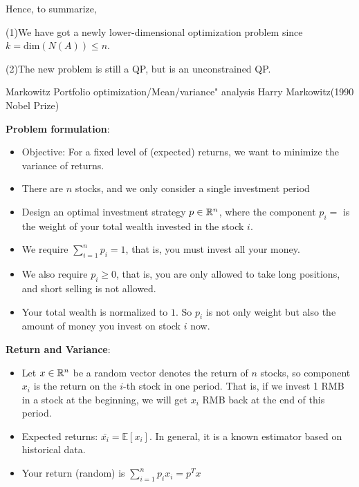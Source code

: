 Hence, to summarize,

(1)We have got a newly lower-dimensional optimization problem since $k =\text{dim}(N(A)) \leq n $.

(2)The new problem is still a QP, but is an unconstrained QP.



\begin{example}{Markowitz Portfolio optimization/Mean/variance" analysis}  Harry Markowitz(1990 Nobel Prize)
	
	
	\textbf{Problem formulation}: 
	\begin{itemize}
		\item Objective: For a fixed level of (expected) returns, we want to minimize the variance of returns.
		
		\item There are $n$ stocks, and we only consider a single investment period\\
		
		\item Design an optimal investment strategy $p\in \mathbb{R}^n$, where the component $p_i = $ is the weight of your total wealth invested in the stock $i$.
		
		\item We require $\sum^n_{i=1}p_i = 1$, that is, you must invest all your money.
		
		\item We also require $p_i \geq 0$, that is, you are only allowed to take long positions, and short selling is not allowed.
		
		\item Your total wealth is normalized to $1$. So $p_i$ is not only weight but also the amount of money you invest on stock $i$ now.
	\end{itemize} 
	
	\textbf{Return and Variance}:
	
	\begin{itemize}
		\item Let $x\in \mathbb{R}^n$ be a random vector denotes the return of $n$ stocks, so component $x_i$ is the return on the $i$-th stock in one period. That is, if we invest 1 RMB in a stock at the beginning, we will get $x_i$ RMB back at the end of this period.

		\item Expected returns: $\bar{x_i} = \mathbb{E}[x_i]$. In general, it is a known estimator based on historical data.
		
		\item Your return (random) is $\sum^n_{i=1}p_ix_i = p^Tx$
		

\end{itemize}
\end{example}
